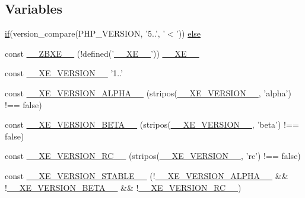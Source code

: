 \subsection*{Variables}
\begin{DoxyCompactItemize}
\item 
\hyperlink{index_8php_a89c9c4ffebb12a316e28d000a981cf89}{if}(version\-\_\-compare(P\-H\-P\-\_\-\-V\-E\-R\-S\-I\-O\-N, '5..', '$<$')) \hyperlink{config_8inc_8php_a249caa62ba3f93fa3cb8d963d5634fe1}{else}
\item 
const \hyperlink{config_8inc_8php_a5dee6469b95523a5bafe17e6b29c6bf7}{\-\_\-\-\_\-\-Z\-B\-X\-E\-\_\-\-\_\-} (!defined('\hyperlink{index_8php_a697de427d83b791899ae45d555377756}{\-\_\-\-\_\-\-X\-E\-\_\-\-\_\-}')) \hyperlink{index_8php_a697de427d83b791899ae45d555377756}{\-\_\-\-\_\-\-X\-E\-\_\-\-\_\-}
\item 
const \hyperlink{config_8inc_8php_afceaaec30d0e5b6a78d0ae28bcbfc8f3}{\-\_\-\-\_\-\-X\-E\-\_\-\-V\-E\-R\-S\-I\-O\-N\-\_\-\-\_\-} '1..'
\item 
const \hyperlink{config_8inc_8php_aaee982ed748e379cde978edfe8d433e1}{\-\_\-\-\_\-\-X\-E\-\_\-\-V\-E\-R\-S\-I\-O\-N\-\_\-\-A\-L\-P\-H\-A\-\_\-\-\_\-} (stripos(\hyperlink{config_8inc_8php_afceaaec30d0e5b6a78d0ae28bcbfc8f3}{\-\_\-\-\_\-\-X\-E\-\_\-\-V\-E\-R\-S\-I\-O\-N\-\_\-\-\_\-}, 'alpha') !== false)
\item 
const \hyperlink{config_8inc_8php_aac8a83557f3eab1d2d2583fe21559ca9}{\-\_\-\-\_\-\-X\-E\-\_\-\-V\-E\-R\-S\-I\-O\-N\-\_\-\-B\-E\-T\-A\-\_\-\-\_\-} (stripos(\hyperlink{config_8inc_8php_afceaaec30d0e5b6a78d0ae28bcbfc8f3}{\-\_\-\-\_\-\-X\-E\-\_\-\-V\-E\-R\-S\-I\-O\-N\-\_\-\-\_\-}, 'beta') !== false)
\item 
const \hyperlink{config_8inc_8php_a1d41a8e68af4b70491bdb523ccb57ac2}{\-\_\-\-\_\-\-X\-E\-\_\-\-V\-E\-R\-S\-I\-O\-N\-\_\-\-R\-C\-\_\-\-\_\-} (stripos(\hyperlink{config_8inc_8php_afceaaec30d0e5b6a78d0ae28bcbfc8f3}{\-\_\-\-\_\-\-X\-E\-\_\-\-V\-E\-R\-S\-I\-O\-N\-\_\-\-\_\-}, 'rc') !== false)
\item 
const \hyperlink{config_8inc_8php_ae578aaae34567264807d3f832230c1ed}{\-\_\-\-\_\-\-X\-E\-\_\-\-V\-E\-R\-S\-I\-O\-N\-\_\-\-S\-T\-A\-B\-L\-E\-\_\-\-\_\-} (!\hyperlink{config_8inc_8php_aaee982ed748e379cde978edfe8d433e1}{\-\_\-\-\_\-\-X\-E\-\_\-\-V\-E\-R\-S\-I\-O\-N\-\_\-\-A\-L\-P\-H\-A\-\_\-\-\_\-} \&\& !\hyperlink{config_8inc_8php_aac8a83557f3eab1d2d2583fe21559ca9}{\-\_\-\-\_\-\-X\-E\-\_\-\-V\-E\-R\-S\-I\-O\-N\-\_\-\-B\-E\-T\-A\-\_\-\-\_\-} \&\& !\hyperlink{config_8inc_8php_a1d41a8e68af4b70491bdb523ccb57ac2}{\-\_\-\-\_\-\-X\-E\-\_\-\-V\-E\-R\-S\-I\-O\-N\-\_\-\-R\-C\-\_\-\-\_\-})

\end{DoxyCompactItemize}
